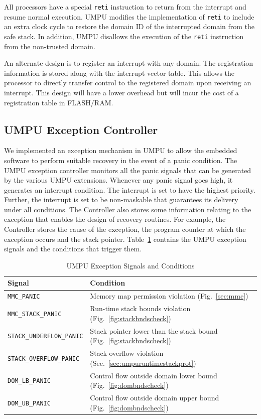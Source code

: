 All processors have a special \texttt{reti} instruction to return from
the interrupt and resume normal execution.
%
UMPU modifies the implementation of \texttt{reti} to include an extra
clock cycle to restore the domain ID of the interrupted domain from
the safe stack.
%
In addition, UMPU disallows the execution of the \texttt{reti} instruction from the non-trusted domain.

An alternate design is to register an interrupt with any
domain.
%
The registration information is stored along with the interrupt
vector table.
%
This allows the processor to directly transfer control to the registered domain
upon receiving an interrupt.
%
This design will have a lower overhead but will incur the cost of a
registration table in FLASH/RAM.
\subsection{UMPU Exception Controller}
%
We implemented an exception mechanism in UMPU to allow the
embedded software to perform suitable recovery in the event of a panic
condition.
%
The UMPU exception controller monitors all the panic signals that can
be generated by the various UMPU extensions.
%
Whenever any panic signal goes high, it generates an interrupt
condition.
%
The interrupt is set to have the highest priority.
%
Further, the interrupt is set to be non-maskable that guarantees its
delivery under all conditions.
%
The Controller also stores some information relating to the exception
that enables the design of recovery routines.
%
For example, the Controller stores the cause of the exception, the
program counter at which the exception occurs and the stack pointer.
%
Table~\ref{tab:umpuexceptions} contains the UMPU exception signals and
the conditions that trigger them.
%
\begin{table}[htdp]
\centering
\small{
\begin{tabular}{|l|l|}
	\hline
	Signal & Condition\\
	\hline
	\texttt{MMC\_PANIC} & Memory map permission violation
        (Fig.~\ref{sec:mmc})\\
	\texttt{MMC\_STACK\_PANIC} & Run-time stack bounds violation
        (Fig.~\ref{fig:stackbndscheck})\\
	\texttt{STACK\_UNDERFLOW\_PANIC} & Stack pointer lower than
        the stack bound (Fig.~\ref{fig:stackbndscheck}) \\
	\texttt{STACK\_OVERFLOW\_PANIC} & Stack overflow violation
        (Sec.~\ref{sec:umpuruntimestackprot})\\
        \texttt{DOM\_LB\_PANIC} & Control flow outside domain lower
        bound (Fig.~\ref{fig:dombndscheck})\\
        \texttt{DOM\_UB\_PANIC} & Control flow outside domain upper
        bound (Fig.~\ref{fig:dombndscheck})\\
	\hline
\end{tabular}}
\caption{UMPU Exception Signals and Conditions}
\label{tab:umpuexceptions}
\end{table}

